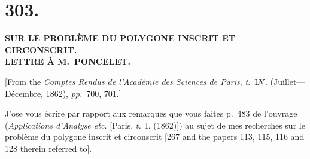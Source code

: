 \documentclass[11pt,a4paper]{article}
\newcommand{\tome}{\textit{t.}}
\newcommand{\pages}{\textit{pp.}}
\begin{document}
\clearpage


\section*{303.}

\begin{center}
\textbf{SUR LE PROBL\`{E}ME DU POLYGONE INSCRIT ET CIRCONSCRIT.}\\[0.5em]
\textbf{LETTRE \`{A} M.~PONCELET.}
\end{center}

[From the \textit{Comptes Rendus de l'Acad\'{e}mie des Sciences de Paris}, \tome~LV. (Juillet---D\'{e}cembre, 1862), \pages~700, 701.]

\medskip

J'ose vous \'{e}crire par rapport aux remarques que vous faites p.~483 de l'ouvrage (\textit{Applications d'Analyse etc.} [Paris, \tome~I. (1862)]) au sujet de mes recherches sur le probl\`{e}me du polygone inscrit et circonscrit [267 and the papers 113, 115, 116 and 128 therein referred to].
\end{document}
